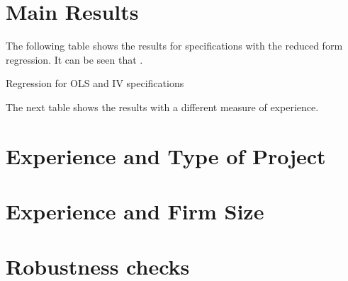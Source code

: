 \section{Main Results}

The following table shows the results for specifications with the reduced form regression. It can be seen that .

\begin{table}[!htbp] \centering
  \caption{Regression for OLS and IV specifications}
  \label{}
  \resizebox{\textwidth}{!}{
}

\end{table}

The next table shows the results with a different measure of experience.

\section{Experience and Type of Project}

\section{Experience and Firm Size}

\section{Robustness checks}
